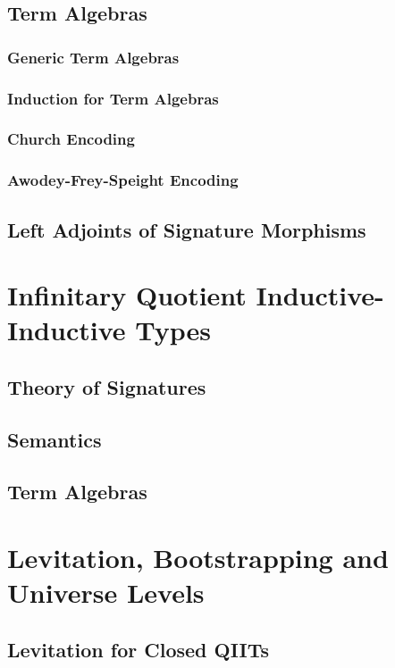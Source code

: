 \documentclass[12pt,a4paper,twoside,openany]{book}
\theoremstyle{remark}
\theoremstyle{definition}
\theoremstyle{theorem}
\begin{document}
\section{Term Algebras}
\label{sec:fqiit-term-algebras}
\subsection{Generic Term Algebras}
\subsection{Induction for Term Algebras}
\subsection{Church Encoding}
\subsection{Awodey-Frey-Speight Encoding}

\section{Left Adjoints of Signature Morphisms}




\chapter{Infinitary Quotient Inductive-Inductive Types}
\label{chap:iqiit}
\section{Theory of Signatures}
\section{Semantics}
\section{Term Algebras}

\chapter{Levitation, Bootstrapping and Universe Levels}
\label{chap:levitation}
\section{Levitation for Closed QIITs}
\end{document}
